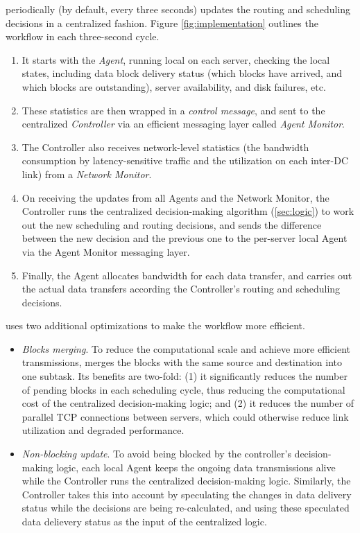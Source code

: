 \name periodically (by default, every three seconds) updates the
routing and scheduling decisions in a centralized fashion.
Figure \ref{fig:implementation} outlines the workflow in each
three-second cycle.
\begin{enumerate}
\item It starts with the {\em Agent}, running local on each server,
checking the local states, including data block delivery status
(which blocks have arrived, and which blocks are outstanding),
server availability, and disk failures, etc.
\item These statistics are then wrapped in a {\em control message},
and sent to the centralized {\em \name Controller} via an efficient
messaging layer called {\em Agent Monitor}.
\item The \name Controller also receives network-level statistics
(the bandwidth consumption by latency-sensitive traffic and the
utilization on each inter-DC link) from a {\em Network Monitor}.
\item On receiving the updates from all Agents and the Network
Monitor, the \name Controller runs the centralized decision-making
algorithm (\Section\ref{sec:logic}) to work out the new scheduling
and routing decisions, and sends the difference between the new
decision and the previous one to the per-server local Agent via
the Agent Monitor messaging layer.
\item Finally, the Agent allocates bandwidth for each data transfer,
and carries out the actual data transfers according the Controller's
routing and scheduling decisions.
\end{enumerate}


\name uses two additional optimizations to make the workflow
more efficient.
\begin{itemize}
\item \emph{Blocks merging}.
To reduce the computational scale and achieve more efficient
transmissions, \name merges the blocks with the same source and
destination into one subtask. Its benefits are two-fold: (1) it
significantly reduces the number of pending blocks in each
scheduling cycle, thus reducing the computational cost of the
centralized decision-making logic; and (2) it reduces the number
of parallel TCP connections between servers, which could
otherwise reduce link utilization and degraded performance.
\item \emph{Non-blocking update}.
To avoid being blocked by the controller's decision-making logic,
each local Agent  keeps the ongoing data transmissions alive while
the Controller runs the centralized decision-making logic.
Similarly, the Controller takes this into account by speculating
the changes in data delivery status while the decisions are being
re-calculated, and using these speculated data delievery status as
the input of the centralized logic.
\end{itemize}

